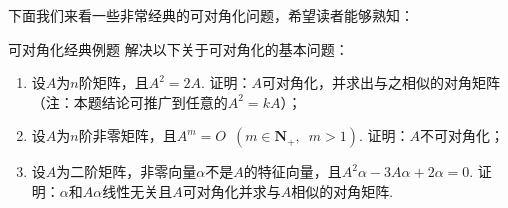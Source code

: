 下面我们来看一些非常经典的可对角化问题，希望读者能够熟知：
\begin{example}{}{可对角化经典例题}
    解决以下关于可对角化的基本问题：
    \begin{enumerate}
        \item 设$A$为$n$阶矩阵，且$A^2=2A$. 证明：$A$可对角化，并求出与之相似的对角矩阵（注：本题结论可推广到任意的$A^2=kA$）；

        \item 设$A$为$n$阶非零矩阵，且$A^m=O\enspace(m\in\mathbf{N}_+,\enspace m>1)$. 证明：$A$不可对角化；

        \item 设$A$为二阶矩阵，非零向量$\alpha$不是$A$的特征向量，且$A^2\alpha-3A\alpha+2\alpha=0$. 证明：$\alpha$和$A\alpha$线性无关且$A$可对角化并求与$A$相似的对角矩阵.
    \end{enumerate}
\end{example}

